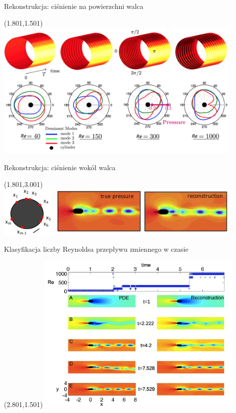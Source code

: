 \documentclass[aspectratio=169]{beamer}
\begin{document}
\begin{frame} {Rekonstrukcja: ciśnienie na powierzchni walca}
\begin{textblock}{13}(1.801,1.501)
	\includegraphics[width=12cm]{imgs/time_dynamics.png}
\end{textblock}
\end{frame}

\begin{frame} {Rekonstrukcja: ciśnienie wokół walca}
\begin{textblock}{13}(1.801,3.001)
	\includegraphics[width=12cm]{imgs/reconstruction.png}
\end{textblock}
\end{frame}

\begin{frame} {Klasyfikacja liczby Reynoldsa przepływu zmiennego w czasie}
\begin{textblock}{13}(2.801,1.501)
	\includegraphics[width=10cm]{imgs/reconstruction2.png}
\end{textblock}
\end{frame}
\end{document}
